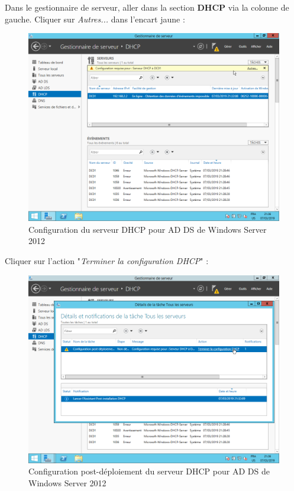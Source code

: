 \newpage
Dans le gestionnaire de serveur, aller dans la section \textbf{DHCP} via la colonne de gauche. Cliquer sur \textit{Autres...} dans l'encart jaune :
\begin{figure}[h!]
    \begin{center}
        \includegraphics[scale=0.6]{WS2012_Screenshots/66.png}
        \caption{Configuration du serveur DHCP pour AD DS de Windows Server 2012}
        \label{WS2012_Screenshots/66}
    \end{center}
\end{figure}
\FloatBarrier

\newpage
Cliquer sur l'action "\textit{Terminer la configuration DHCP}" :
\begin{figure}[h!]
    \begin{center}
        \includegraphics[scale=0.6]{WS2012_Screenshots/67.png}
        \caption{Configuration post-déploiement du serveur DHCP pour AD DS de Windows Server 2012}
        \label{WS2012_Screenshots/67}
    \end{center}
\end{figure}
\FloatBarrier

